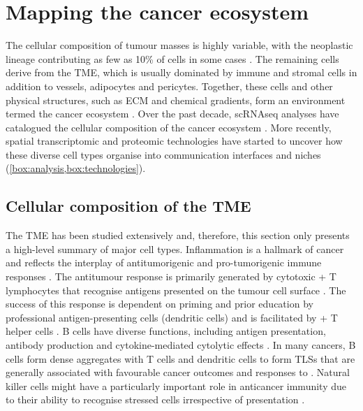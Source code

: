\section{Mapping the cancer ecosystem}
\label{sec:mapping-the-cancer-ecosystem}
The cellular composition of tumour masses is highly variable, with the neoplastic lineage contributing as few as 10\% of cells in some cases \parencite{Aran2015-dw}. The remaining cells derive from the TME, which is usually dominated by immune and stromal cells in addition to vessels, adipocytes and pericytes. Together, these cells and other physical structures, such as \ac{ECM} and chemical gradients, form an environment termed the cancer ecosystem \parencite{Somarelli2021-va}. Over the past decade, \ac{scRNAseq} analyses have catalogued the cellular composition of the cancer ecosystem \parencite{Darmanis2017-yb,Venteicher2017-mo,Pombo_Antunes2021-md,Puram2017-mn,Tirosh2016-rl,Izar2020-tf,Lambrechts2018-hx,Chung2017-ic}. More recently, spatial transcriptomic and proteomic technologies have started to uncover how these diverse cell types organise into communication interfaces and niches \parencite{Schapiro2017-gy,Arnol2019-fv} (\cref{box:analysis,box:technologies}).

\subsection*{Cellular composition of the \ac{TME}}
The \ac{TME} has been studied extensively and, therefore, this section only presents a high-level summary of major cell types. Inflammation is a hallmark of cancer \parencite{Hanahan2011-cd} and reflects the interplay of antitumorigenic and pro-tumorigenic immune responses . The antitumour response is primarily generated by cytotoxic + T lymphocytes that recognise antigens presented on the tumour cell surface \parencite{Raskov2021-gb,Philip2022-ly}. The success of this response is dependent on priming and prior education by professional antigen-presenting cells (dendritic cells) and is facilitated by + T helper cells \parencite{Borst2018-tp,Waldman2020-kf}. B cells have diverse functions, including antigen presentation, antibody production and cytokine-mediated cytolytic effects \parencite{Sharonov2020-vx}. In many cancers, B cells form dense aggregates with T cells and dendritic cells to form \acp{TLS} \parencite{Schumacher2022-mr} that are generally associated with favourable cancer outcomes and responses to  \parencite{Sautes-Fridman2019-nl}. Natural killer cells might have a particularly important role in anticancer immunity due to their ability to recognise stressed cells irrespective of  presentation \parencite{Wolf2023-hu}.

